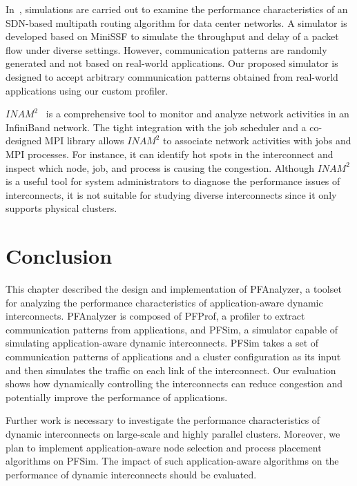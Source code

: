 In~\autocite{Jo2015}, simulations are carried out to examine the
performance characteristics of an SDN-based multipath routing algorithm
for data center networks. A simulator is developed based on MiniSSF to
simulate the throughput and delay of a packet flow under diverse
settings. However, communication patterns are randomly generated and not
based on real-world applications. Our proposed simulator is designed to
accept arbitrary communication patterns obtained from real-world
applications using our custom profiler.

\(\mathit{INAM}^2\)~\autocite{Subramoni2016} is a comprehensive tool to
monitor and analyze network activities in an InfiniBand network. The
tight integration with the job scheduler and a co-designed MPI library
allows \(\mathit{INAM}^2\) to associate network activities with jobs and
MPI processes. For instance, it can identify hot spots in the
interconnect and inspect which node, job, and process is causing the
congestion. Although \(\mathit{INAM}^2\) is a useful tool for system
administrators to diagnose the performance issues of interconnects, it
is not suitable for studying diverse interconnects since it only
supports physical clusters.

\section{Conclusion}\label{sec:ii-conclusion}

This chapter described the design and implementation of PFAnalyzer, a
toolset for analyzing the performance characteristics of
application-aware dynamic interconnects. PFAnalyzer is composed of
PFProf, a profiler to extract communication patterns from applications,
and PFSim, a simulator capable of simulating application-aware dynamic
interconnects. PFSim takes a set of communication patterns of
applications and a cluster configuration as its input and then simulates
the traffic on each link of the interconnect. Our evaluation shows how
dynamically controlling the interconnects can reduce congestion and
potentially improve the performance of applications.

Further work is necessary to investigate the performance characteristics
of dynamic interconnects on large-scale and highly parallel clusters.
Moreover, we plan to implement application-aware node selection and
process placement algorithms on PFSim. The impact of such
application-aware algorithms on the performance of dynamic interconnects
should be evaluated.
